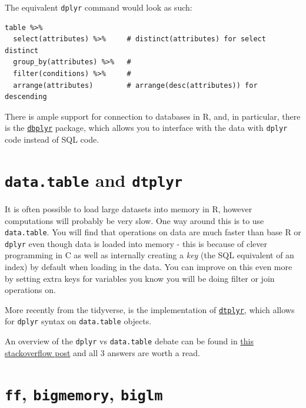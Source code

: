 \documentclass[]{book}
\begin{document}
The equivalent \texttt{dplyr} command would look as such:

\begin{verbatim}
table %>%
  select(attributes) %>%     # distinct(attributes) for select distinct
  group_by(attributes) %>%   # 
  filter(conditions) %>%     # 
  arrange(attributes)        # arrange(desc(attributes)) for descending
\end{verbatim}

There is ample support for connection to databases in R, and, in particular, there is the \href{https://dbplyr.tidyverse.org}{\texttt{dbplyr}} package, which allows you to interface with the data with \texttt{dplyr} code instead of SQL code.

\hypertarget{data.table-and-dtplyr}{%
\section{\texorpdfstring{\texttt{data.table} and \texttt{dtplyr}}{data.table and dtplyr}}\label{data.table-and-dtplyr}}

It is often possible to load large datasets into memory in R, however computations will probably be very slow. One way around this is to use \texttt{data.table}. You will find that operations on data are much faster than base R or \texttt{dplyr} even though data is loaded into memory - this is because of clever programming in C as well as internally creating a \emph{key} (the SQL equivalent of an index) by default when loading in the data. You can improve on this even more by setting extra keys for variables you know you will be doing filter or join operations on.

More recently from the tidyverse, is the implementation of \href{https://dtplyr.tidyverse.org}{\texttt{dtplyr}}, which allows for \texttt{dplyr} syntax on \texttt{data.table} objects.

An overview of the \texttt{dplyr} vs \texttt{data.table} debate can be found in \href{https://stackoverflow.com/questions/21435339/data-table-vs-dplyr-can-one-do-something-well-the-other-cant-or-does-poorly/27840349\#27840349}{this stackoverflow post} and all 3 answers are worth a read.

\hypertarget{ff-bigmemory-biglm}{%
\section{\texorpdfstring{\texttt{ff}, \texttt{bigmemory}, \texttt{biglm}}{ff, bigmemory, biglm}}\label{ff-bigmemory-biglm}}
\end{document}
